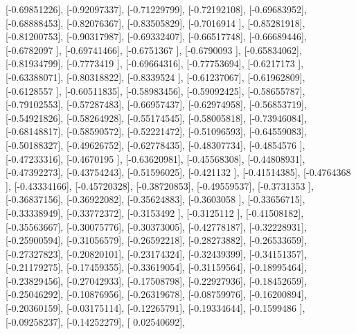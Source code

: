 \documentclass{article}
\begin{document}
       [-0.69851226],
       [-0.92097337],
       [-0.71229799],
       [-0.72192108],
       [-0.69683952],
       [-0.68888453],
       [-0.82076367],
       [-0.83505829],
       [-0.7016914 ],
       [-0.85281918],
       [-0.81200753],
       [-0.90317987],
       [-0.69332407],
       [-0.66517748],
       [-0.66689446],
       [-0.6782097 ],
       [-0.69741466],
       [-0.6751367 ],
       [-0.6790093 ],
       [-0.65834062],
       [-0.81934799],
       [-0.7773419 ],
       [-0.69664316],
       [-0.77753694],
       [-0.6217173 ],
       [-0.63388071],
       [-0.80318822],
       [-0.8339524 ],
       [-0.61237067],
       [-0.61962809],
       [-0.6128557 ],
       [-0.60511835],
       [-0.58983456],
       [-0.59092425],
       [-0.58655787],
       [-0.79102553],
       [-0.57287483],
       [-0.66957437],
       [-0.62974958],
       [-0.56853719],
       [-0.54921826],
       [-0.58264928],
       [-0.55174545],
       [-0.58005818],
       [-0.73946084],
       [-0.68148817],
       [-0.58590572],
       [-0.52221472],
       [-0.51096593],
       [-0.64559083],
       [-0.50188327],
       [-0.49626752],
       [-0.62778435],
       [-0.48307734],
       [-0.4854576 ],
       [-0.47233316],
       [-0.4670195 ],
       [-0.63620981],
       [-0.45568308],
       [-0.44808931],
       [-0.47392273],
       [-0.43754243],
       [-0.51596025],
       [-0.421132  ],
       [-0.41514385],
       [-0.4764368 ],
       [-0.43334166],
       [-0.45720328],
       [-0.38720853],
       [-0.49559537],
       [-0.3731353 ],
       [-0.36837156],
       [-0.36922082],
       [-0.35624883],
       [-0.3603058 ],
       [-0.33656715],
       [-0.33338949],
       [-0.33772372],
       [-0.3153492 ],
       [-0.3125112 ],
       [-0.41508182],
       [-0.35563667],
       [-0.30075776],
       [-0.30373005],
       [-0.42778187],
       [-0.32228931],
       [-0.25900594],
       [-0.31056579],
       [-0.26592218],
       [-0.28273882],
       [-0.26533659],
       [-0.27327823],
       [-0.20820101],
       [-0.23174324],
       [-0.32439399],
       [-0.34151357],
       [-0.21179275],
       [-0.17459355],
       [-0.33619054],
       [-0.31159564],
       [-0.18995464],
       [-0.23829456],
       [-0.27042933],
       [-0.17508798],
       [-0.22927936],
       [-0.18452659],
       [-0.25046292],
       [-0.10876956],
       [-0.26319678],
       [-0.08759976],
       [-0.16200894],
       [-0.20360159],
       [-0.03175114],
       [-0.12265791],
       [-0.19334644],
       [-0.1599486 ],
       [-0.09258237],
       [-0.14252279],
       [ 0.02540692],
\end{document}
